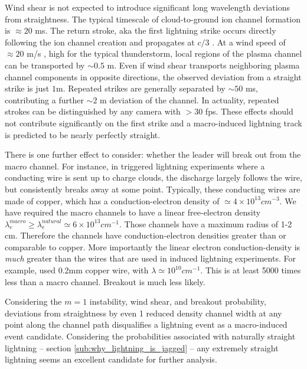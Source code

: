 \documentclass[%
 reprint,
 amsmath,amssymb,
 aps,
 nofootinbib, %
]{revtex4-2}
\begin{document}
        Wind shear is not expected to introduce significant long wavelength deviations from straightness. The typical timescale of cloud-to-ground ion channel formation is ${\approx 20}$ ms. The return stroke, aka the first lightning strike \citep{DwyerUman2014} occurs directly following the ion channel creation and propagates at $c/3$ \citep{Idone1987}. At a wind speed of ${\approx 20}$ m/s \citep{Choi2004}, high for the typical thunderstorm, local regions of the plasma channel can be transported by ${\sim 0.5}$ m. Even if wind shear transports neighboring plasma channel components in opposite directions, the observed deviation from a straight strike is just $1$m. Repeated strikes are generally separated by ${\sim 50}$ ms, contributing a further ${\sim 2}$ m deviation of the channel. In actuality, repeated strokes can be distinguished by any camera with $>30$ fps. These effects should not contribute significantly on the first strike and a macro-induced lightning track is predicted to be nearly perfectly straight.
        
        There is one further effect to consider: whether the leader will break out from the macro channel. For instance, in triggered lightning experiments where a conducting wire is sent up to charge clouds, the discharge largely follows the wire, but consistently breaks away at some point. Typically, these conducting wires are made of copper, which has a conduction-electron density of $\simeq 4 \times 10^{13} cm^{-3}$. We have required the macro channels to have a linear free-electron density $\lambda_e^{macro} \geq \lambda_e^{natural} \simeq 6 \times 10^{13} cm^{-1}$. Those channels have a maximum radius of 1-2 cm. Therefore the channels have conduction-electron densities greater than or comparable to copper. More importantly the linear electron conduction-density is \textit{much} greater than the wires that are used in induced lightning experiments. For example, \citeauthor{Betts2003} \citep{Betts2003} used 0.2mm copper wire, with $\lambda\simeq 10^{10} cm^{-1}$. This is at least 5000 times less than a macro channel. Breakout is much less likely.

        Considering the $m=1$ instability, wind shear, and breakout probability, deviations from straightness by even 1 reduced density channel width at any point along the channel path disqualifies a lightning event as a macro-induced event candidate. Considering the probabilities associated with naturally straight lightning -- section \ref{sub:why_lightning_is_jagged} -- any extremely straight lightning seems an excellent candidate for further analysis.
\end{document}
